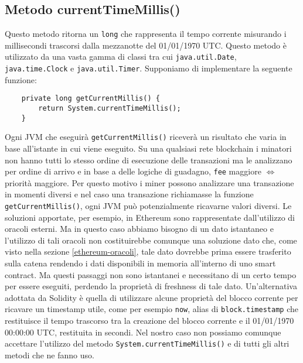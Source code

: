 		\subsection{Metodo currentTimeMillis()}
			Questo metodo ritorna un \lstinline|long| che rappresenta il tempo corrente misurando i millisecondi trascorsi dalla mezzanotte del 01/01/1970 UTC. 
			Questo metodo è utilizzato da una vasta gamma di classi tra cui \lstinline|java.util.Date|, \lstinline|java.time.Clock| e \lstinline|java.util.Timer|. Supponiamo di implementare la seguente funzione: 
		\begin{lstlisting}
	private long getCurrentMillis() {
		return System.currentTimeMillis();
	}
		\end{lstlisting}
			Ogni JVM che eseguirà \lstinline|getCurrentMillis()| riceverà un risultato che varia in base all'istante in cui viene eseguito. Su una qualsiasi rete blockchain i minatori non hanno tutti lo stesso ordine di esecuzione delle transazioni ma le analizzano per ordine di arrivo e in base a delle logiche di guadagno, \lstinline|fee| maggiore $\Leftrightarrow$ priorità maggiore. Per questo motivo i miner possono analizzare una transazione in momenti diversi e nel caso una transazione richiamasse la funzione \lstinline|getCurrentMillis()|, ogni JVM può potenzialmente ricavarne valori diversi. Le soluzioni apportate, per esempio, in Ethereum sono rappresentate dall'utilizzo di oracoli esterni. Ma in questo caso abbiamo bisogno di un dato istantaneo e l'utilizzo di tali oracoli non costituirebbe comunque una soluzione dato che, come visto nella sezione \ref{ethereum-oracoli}, tale dato dovrebbe prima essere trasferito sulla catena rendendo i dati disponibili in memoria all'interno di uno smart contract. Ma questi passaggi non sono istantanei e necessitano di un certo tempo per essere eseguiti, perdendo la proprietà di freshness di tale dato. Un'alternativa adottata da Solidity è quella di utilizzare alcune proprietà del blocco corrente per ricavare un timestamp utile, come per esempio \lstinline|now|, alias di \lstinline|block.timestamp| che restituisce il tempo trascorso tra la creazione del blocco corrente e il 01/01/1970 00:00:00 UTC, restituita in secondi.
			Nel nostro caso non possiamo comunque accettare l'utilizzo del metodo \lstinline|System.currentTimeMillis()| e di tutti gli altri metodi che ne fanno uso.
